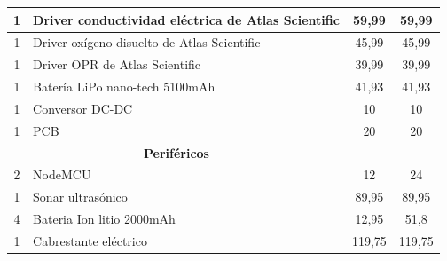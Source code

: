 \begin{appendices}
\begin{table}[t]
\begin{tabular}{clcc}
\multicolumn{1}{|c|}{1}                 & \multicolumn{1}{l|}{Driver conductividad eléctrica de Atlas Scientific} & \multicolumn{1}{c|}{59,99}              & \multicolumn{1}{c|}{59,99}              \\ \hline
\multicolumn{1}{|c|}{1}                 & \multicolumn{1}{l|}{Driver oxígeno disuelto de Atlas Scientific}        & \multicolumn{1}{c|}{45,99}              & \multicolumn{1}{c|}{45,99}              \\ \hline
\multicolumn{1}{|c|}{1}                 & \multicolumn{1}{l|}{Driver OPR de Atlas Scientific}                     & \multicolumn{1}{c|}{39,99}              & \multicolumn{1}{c|}{39,99}              \\ \hline
\multicolumn{1}{|c|}{1}                 & \multicolumn{1}{l|}{Batería LiPo nano-tech 5100mAh}                     & \multicolumn{1}{c|}{41,93}              & \multicolumn{1}{c|}{41,93}              \\ \hline
\multicolumn{1}{|c|}{1}                 & \multicolumn{1}{l|}{Conversor DC-DC}                                    & \multicolumn{1}{c|}{10}                 & \multicolumn{1}{c|}{10}                 \\ \hline
\multicolumn{1}{|c|}{1}                 & \multicolumn{1}{l|}{PCB}                                                & \multicolumn{1}{c|}{20}                 & \multicolumn{1}{c|}{20}                 \\ \hline
\multicolumn{2}{|c|}{\textbf{Periféricos}}                                                                        & \multicolumn{2}{l|}{}                                                             \\ \hline
\multicolumn{1}{|c|}{2}                 & \multicolumn{1}{l|}{NodeMCU}                                            & \multicolumn{1}{c|}{12}                 & \multicolumn{1}{c|}{24}                 \\ \hline
\multicolumn{1}{|c|}{1}                 & \multicolumn{1}{l|}{Sonar ultrasónico}                                  & \multicolumn{1}{c|}{89,95}              & \multicolumn{1}{c|}{89,95}              \\ \hline
\multicolumn{1}{|c|}{4}                 & \multicolumn{1}{l|}{Bateria Ion litio 2000mAh}                          & \multicolumn{1}{c|}{12,95}              & \multicolumn{1}{c|}{51,8}               \\ \hline
\multicolumn{1}{|c|}{1}                 & \multicolumn{1}{l|}{Cabrestante eléctrico}                              & \multicolumn{1}{c|}{119,75}             & \multicolumn{1}{c|}{119,75}             \\ \hline

\end{tabular}
\end{table}
\end{appendices}
